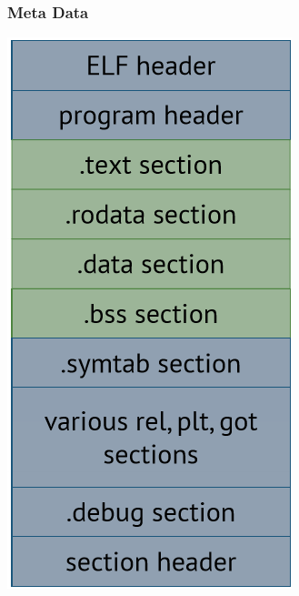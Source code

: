 \documentclass[letterpaper,12pt]{article}
\begin{document}
\subsubsection{Meta Data}
\includegraphics*{./Images/Meta Data of Executable.png}
\end{document}

